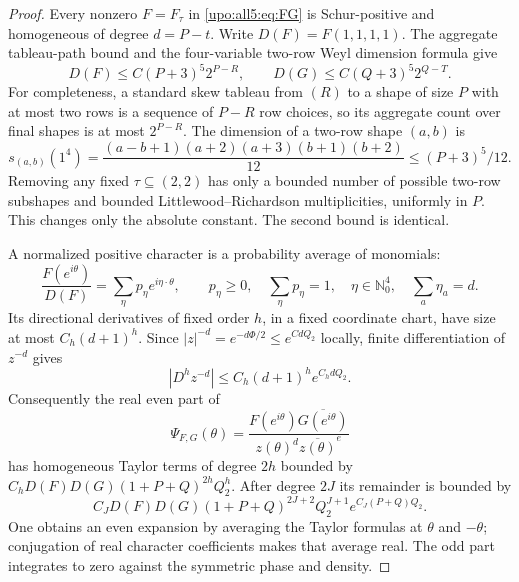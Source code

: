 \documentclass[11pt,letterpaper]{article}
\theoremstyle{remark}\newtheorem{remark}[theorem]{Remark}
\numberwithin{equation}{section}
\newcommand{\NN}{\mathbb N_0}
\begin{document}
\begin{proof}
Every nonzero $F=F_\tau$ in \eqref{upo:all5:eq:FG} is Schur-positive and
homogeneous of degree $d=P-t$. Write $D(F)=F(1,1,1,1)$.
The aggregate tableau-path bound and the four-variable two-row
Weyl dimension formula give
\begin{equation}\label{upo:all5:eq:dim-bound}
 D(F)\le C(P+3)^5 2^{P-R},\qquad
 D(G)\le C(Q+3)^5 2^{Q-T}.
\end{equation}
For completeness, a standard skew tableau from $(R)$ to a shape
of size $P$ with at most two rows is a sequence of $P-R$ row choices,
so its aggregate count over final shapes is at most $2^{P-R}$.
The dimension of a two-row shape $(a,b)$ is
\[
 s_{(a,b)}(1^4)=
 \frac{(a-b+1)(a+2)(a+3)(b+1)(b+2)}{12}\le(P+3)^5/12.
\]
Removing any fixed $\tau\subseteq(2,2)$ has only a bounded number
of possible two-row subshapes and bounded Littlewood--Richardson
multiplicities, uniformly in $P$. This changes only the absolute
constant. The second bound is identical.

A normalized positive character is a probability average of monomials:
\[
 \frac{F(e^{i\theta})}{D(F)}
      =\sum_\eta p_\eta e^{i\eta\cdot\theta},\qquad
 p_\eta\ge0,\quad\sum_\eta p_\eta=1,\quad
 \eta\in\NN^4,\quad\sum_a\eta_a=d.
\]
Its directional derivatives of fixed order $h$, in a fixed coordinate
chart, have size at most $C_h(d+1)^h$.
Since $|z|^{-d}=e^{-d\Phi/2}\le e^{CdQ_2}$ locally, finite
differentiation of $z^{-d}$ gives
\begin{equation}\label{upo:all5:eq:quotient-bound}
 |D^h z^{-d}|\le C_h(d+1)^h e^{C_hdQ_2}.
\end{equation}
Consequently the real even part of
\begin{equation}\label{upo:all5:eq:psi}
 \Psi_{F,G}(\theta)
   =\frac{F(e^{i\theta})\overline{G(e^{i\theta})}}
          {z(\theta)^d\overline{z(\theta)}^e}
\end{equation}
has homogeneous Taylor terms of degree $2h$ bounded by
$C_hD(F)D(G)(1+P+Q)^{2h}Q_2^h$. After degree $2J$ its remainder
is bounded by
\begin{equation}\label{upo:all5:eq:psi-remainder}
 C_JD(F)D(G)(1+P+Q)^{2J+2}
    Q_2^{J+1}e^{C_J(P+Q)Q_2}.
\end{equation}
One obtains an even expansion by averaging the Taylor formulas at
$\theta$ and $-\theta$; conjugation of real character coefficients
makes that average real. The odd part integrates to zero against
the symmetric phase and density.


\end{proof}
\end{document}
